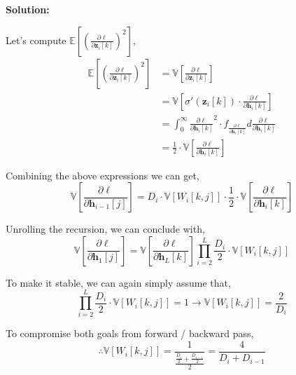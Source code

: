\documentclass{article}
\newenvironment{solution}
  {\par\noindent\textbf{Solution:}\par}
  {\par}
\begin{document}
\begin{solution}
    Let's compute $\mathbb{E}\left[ \left(\frac{\partial \ell}{\partial \textbf{z}_i[k]} \right)^2 \right]$,
    \[
      \begin{aligned}
        \mathbb{E}\left[ \left(\frac{\partial \ell}{\partial \textbf{z}_i[k]} \right)^2\right]&= \mathbb{V} \left[ \frac{\partial \ell}{\partial \textbf{z}_i[k]} \right] \\ 
                                                                                              &= \mathbb{V}\left[ \sigma '\left( \textbf{z}_i[k]\right) \cdot \frac{\partial \ell}{\partial \textbf{h}_i[k]}
 \right] \\
                                                                                              &=\int_{0}^{\infty}  \frac{\partial \ell}{\partial \textbf{h}_i[k]}^2 \cdot f_{\frac{\partial \ell}{\partial \textbf{h}_i[k]}} d\frac{\partial \ell}{\partial \textbf{h}_i[k]} \\ 
                                                                                              &= \frac{1}{2} \cdot \mathbb{V}\left[\frac{\partial \ell}{\partial \textbf{h}_i[k]} \right] 
      \end{aligned}
    \]

    Combining the above expressions we can get,
  \[
    \mathbb{V}\left[\frac{\partial \ell}{\partial \textbf{h}_{i-1}[j]}\right] = D_i \cdot \mathbb{V}\left[ W_i[k,j] \right] \cdot \frac{1}{2} \cdot \mathbb{V}\left[ \frac{\partial \ell}{\partial \textbf{h}_i[k]} \right] 
  \]

  Unrolling the recursion, we can conclude with,
  \[
    \mathbb{V}\left[ \frac{\partial \ell}{\partial \textbf{h}_1[j]}\right] = \mathbb{V}\left[ \frac{\partial \ell}{\partial \textbf{h}_L[k]}\right] \prod_{i=2}^{L} \frac{D_i}{2}\cdot \mathbb{V}[W_i[k,j]]
  \]

  To make it stable, we can again simply assume that,
  \[
    \prod_{i=2}^{L} \frac{D_i}{2}\cdot \mathbb{V}[W_i[k,j]] = 1 \to \mathbb{V}\left[ W_i[k,j] \right] = \frac{2}{D_i}
  \]

  To compromise both goals from forward / backward pass,
  $$\therefore \mathbb{V}[W_i[k,j]] = \frac{1}{\frac{\frac{D_i}{2} + \frac{D_{i-1}}{2}}{2}} = \frac{4}{D_i + D_{i-1}}$$

  \end{solution}
\end{document}

